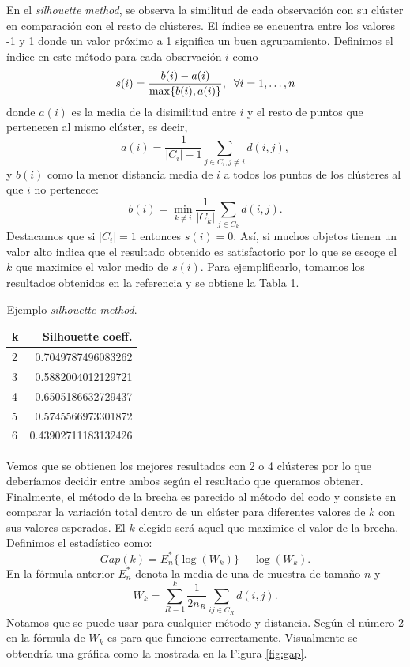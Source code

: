 \documentclass[a4paper, 20pt]{article}
\begin{document}
En el \textit{silhouette method}, se observa la similitud de cada observación con su clúster en comparación con el resto de clústeres. El índice se encuentra entre los valores -1 y 1 donde un valor próximo a 1 significa un buen agrupamiento. Definimos el índice en este método para cada observación $ i $ como
\[
s(i) = \frac{b(i)-a(i)}{\max\{b(i), a(i)\}}, \hspace{2mm} \forall i = 1, \dots, n
\] 
donde $ a(i) $ es la media de la disimilitud entre $ i $ y el resto de puntos que pertenecen al mismo clúster, es decir,
\[
a(i) = \frac{1}{|C_i|-1}\sum_{j\in C_i, j \neq i} d(i,j),
\]
y $ b(i) $ como la menor distancia media de $ i $ a todos los puntos de los clústeres al que $ i $ no pertenece:
\[
b(i) = \min_{k \neq i} \frac{1}{|C_k|} \sum_{j \in C_k} d(i,j).
\] 
Destacamos que si $ |C_i| = 1 $ entonces $ s(i) = 0 $. Así, si muchos objetos tienen un valor alto indica que el resultado obtenido es satisfactorio por lo que se escoge el $ k $ que maximice el valor medio de $ s(i) $. Para ejemplificarlo, tomamos los resultados obtenidos en la referencia \cite{silouetteGraph} y se obtiene la Tabla \ref{tab:sil}.

\begin{table}[h!]
	\centering
	\begin{tabular}{lr} 
		\toprule
		k & Silhouette coeff. \\
		\midrule
		2 &  0.7049787496083262 \\			 
		3 & 0.5882004012129721 \\	
		4 &  0.6505186632729437 \\
		5 &  0.5745566973301872 \\
		6 & 0.43902711183132426 \\
		\bottomrule
	\end{tabular}
	\caption{Ejemplo \textit{silhouette method}.}
        \label{tab:sil}
\end{table}
Vemos que se obtienen los mejores resultados con 2 o 4 clústeres por lo que deberíamos decidir entre ambos según el resultado que queramos obtener. \\

Finalmente, el método de la brecha es parecido al método del codo y consiste en comparar la variación total dentro de un clúster para diferentes valores de $ k $ con sus valores esperados. El $ k $ elegido será aquel que maximice el valor de la brecha. Definimos el estadístico como:
\[
Gap(k) = E^*_n\{ \log(W_k)\} - \log(W_k).
\]
En la fórmula anterior $ E^*_n $ denota la media de una de muestra de tamaño $ n $ y 
\[
W_k = \sum_{R = 1}^{k}\frac{1}{2 n_R}\sum_{i j \in C_R} d(i,j).
\]
Notamos que se puede usar para cualquier método y distancia. Según \cite{tibshirani2001estimating} el número 2 en la fórmula de $ W_k $ es para que funcione correctamente. Visualmente se obtendría una gráfica como la mostrada en la Figura \ref{fig:gap}.
\end{document}
